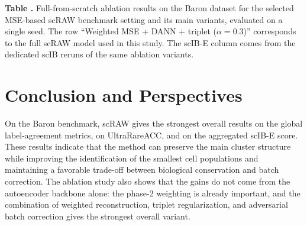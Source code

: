 \documentclass[11pt,a4paper]{article}
\begin{document}
\vspace{\baselineskip}
\noindent\textbf{Table \thetable.}
Full-from-scratch ablation results on the Baron dataset for the selected MSE-based scRAW benchmark setting and its main variants, evaluated on a single seed. The row ``Weighted MSE + DANN + triplet ($\alpha=0.3$)'' corresponds to the full scRAW model used in this study. The scIB-E column comes from the dedicated scIB reruns of the same ablation variants.
\label{tab:ablation_trial206}

\begin{center}
{\small
{}
}
\end{center}

\section{Conclusion and Perspectives}

On the Baron benchmark, scRAW gives the strongest overall results on
the global label-agreement metrics, on UltraRareACC, and on the
aggregated scIB-E score. These results indicate that the method can
preserve the main cluster structure while improving the identification of the
smallest cell populations and maintaining a favorable trade-off between
biological conservation and batch correction. The ablation study also
shows that the gains do not come from the autoencoder backbone alone:
the phase-2 weighting is already important, and the combination of
weighted reconstruction, triplet regularization, and adversarial batch
correction gives the strongest overall variant.
\end{document}
